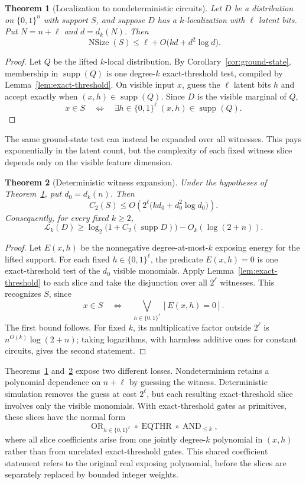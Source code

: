 \documentclass{article}
\newcommand{\LC}{\mathcal{L}}
\newcommand{\supp}{\operatorname{supp}}
\newcommand{\NSize}{\operatorname{NSize}}
\newcommand{\bits}{\{0,1\}}
\newtheorem{theorem}{Theorem}
\begin{document}
\begin{theorem}[Localization to nondeterministic circuits]
\label{thm:converse}
Let $D$ be a distribution on $\bits^n$ with support $S$, and suppose $D$ has a
$k$-localization with $\ell$ latent bits.  Put $N=n+\ell$ and $d=d_k(N)$.  Then
\[
  \NSize(S)\le \ell+O\bigl(kd+d^2\log d\bigr).
\]
\end{theorem}

\begin{proof}
Let $Q$ be the lifted $k$-local distribution.  By
Corollary~\ref{cor:ground-state}, membership in $\supp(Q)$ is one degree-$k$
exact-threshold test, compiled by Lemma~\ref{lem:exact-threshold}.  On visible
input $x$, guess the $\ell$ latent bits $h$ and accept exactly when
$(x,h)\in\supp(Q)$.  Since $D$ is the visible marginal of $Q$,
\[
  x\in S\quad\Longleftrightarrow\quad
  \exists h\in\bits^\ell\; (x,h)\in\supp(Q).
\]
\end{proof}

The same ground-state test can instead be expanded over all witnesses.  This
pays exponentially in the latent count, but the complexity of each fixed
witness slice depends only on the visible feature dimension.

\begin{theorem}[Deterministic witness expansion]
\label{thm:deterministic-converse}
Under the hypotheses of Theorem~\ref{thm:converse}, put $d_0=d_k(n)$.  Then
\[
  C_2(S)
  \le
  O\!\left(2^\ell\bigl(kd_0+d_0^2\log d_0\bigr)\right).
\]
Consequently, for every fixed $k\ge2$,
\[
  \LC_k(D)
  \ge
  \log_2\!\bigl(1+C_2(\supp D)\bigr)-O_k(\log(2+n)).
\]
\end{theorem}

\begin{proof}
Let $E(x,h)$ be the nonnegative degree-at-most-$k$ exposing energy for the
lifted support.  For each fixed $h\in\bits^\ell$, the predicate
$E(x,h)=0$ is one exact-threshold test of the $d_0$ visible monomials.  Apply
Lemma~\ref{lem:exact-threshold} to each slice and take the disjunction over all
$2^\ell$ witnesses.  This recognizes $S$, since
\[
  x\in S
  \quad\Longleftrightarrow\quad
  \bigvee_{h\in\bits^\ell}[E(x,h)=0].
\]
The first bound follows.  For fixed $k$, its multiplicative factor outside
$2^\ell$ is $n^{O(k)}\log(2+n)$; taking logarithms, with harmless additive
ones for constant circuits, gives the second statement.
\end{proof}

Theorems~\ref{thm:converse} and~\ref{thm:deterministic-converse} expose two
different losses.  Nondeterminism retains a polynomial dependence on
$n+\ell$ by guessing the witness.  Deterministic simulation removes the guess
at cost $2^\ell$, but each resulting exact-threshold slice involves only the
visible monomials.  With exact-threshold gates as primitives, these slices
have the normal form
\[
  \operatorname{OR}_{h\in\bits^\ell}
  \circ\operatorname{EQTHR}\circ\operatorname{AND}_{\le k},
\]
where all slice coefficients arise from one jointly degree-$k$ polynomial in
$(x,h)$ rather than from unrelated exact-threshold gates.  This shared
coefficient statement refers to the original real exposing polynomial, before
the slices are separately replaced by bounded integer weights.
\end{document}
